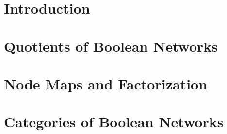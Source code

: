 \documentclass[10pt]{ClemsonThesis}
\theoremstyle{definition}
\begin{document}
    \chapter{Introduction}\label{ch:introduction}

    \chapter{Quotients of Boolean Networks}\label{ch: maps boolean}

    \chapter{Node Maps and Factorization}\label{ch:node-maps-factorization}

    \chapter{Categories of Boolean Networks}\label{ch:categories-boolean}
   



    \singlespacing                             %


    
\end{document}
